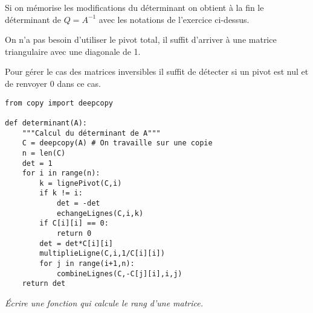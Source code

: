 \begin{Answer}
Si on mémorise les modifications du déterminant on obtient à la fin le déterminant de $Q=A^{-1}$ avec les notations de l'exercice ci-dessus.

On n'a pas besoin d'utiliser le pivot total, il suffit d'arriver à une matrice triangulaire avec une diagonale de 1.

Pour gérer le cas des matrices inversibles il suffit de détecter si un pivot est nul et de renvoyer 0 dans ce cas.
\begin{lstlisting}
from copy import deepcopy

def determinant(A):
    """Calcul du déterminant de A"""
    C = deepcopy(A) # On travaille sur une copie
    n = len(C)
    det = 1
    for i in range(n):
        k = lignePivot(C,i)
        if k != i: 
            det = -det
            echangeLignes(C,i,k)
        if C[i][i] == 0:
            return 0
        det = det*C[i][i]
        multiplieLigne(C,i,1/C[i][i])
        for j in range(i+1,n):
            combineLignes(C,-C[j][i],i,j)
    return det
\end{lstlisting}
\newpage
\end{Answer}
\begin{Exercise}[title=Rang]
\textit{Écrire une fonction qui calcule le rang d'une matrice.}
\end{Exercise}
